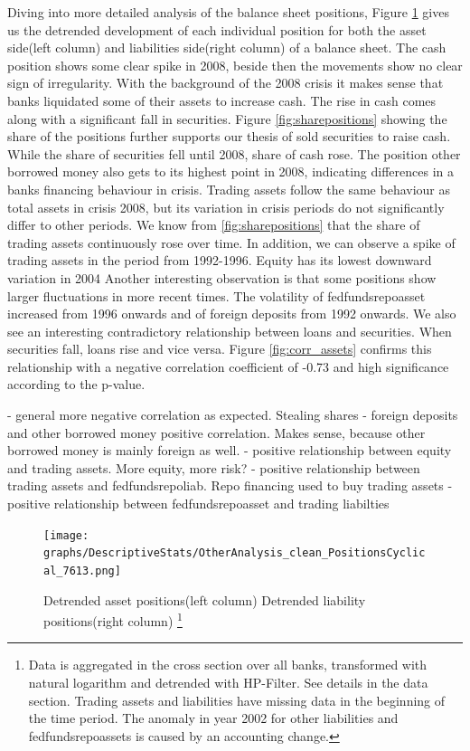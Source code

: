 \documentclass[12pt, a4paper]{article} %
\begin{document}
Diving into more detailed analysis of the balance sheet positions, Figure \ref{fig:positions} gives us the detrended development of each individual position for both the asset side(left column) and liabilities side(right column) of a balance sheet. 
The cash position shows some clear spike in 2008, beside then the movements show no clear sign of irregularity. With the background of the 2008 crisis it makes sense that banks liquidated some of their assets to increase cash. The rise in cash comes along with a significant fall in securities. Figure \ref{fig:sharepositions} showing the share of the positions further supports our thesis of sold securities to raise cash. While the share of securities fell until 2008, share of cash rose.
The position other borrowed money also gets to its highest point in 2008, indicating differences in a banks financing behaviour in crisis. 
Trading assets follow the same behaviour as total assets in crisis 2008, but its variation in crisis periods do not significantly differ to other periods. We know from \ref{fig:sharepositions} that the share of trading assets continuously rose over time. In addition, we can observe a spike of trading assets in the period from 1992-1996.
Equity has its lowest downward variation in 2004
Another interesting observation is that some positions show larger fluctuations in more recent times. The volatility of fedfundsrepoasset increased from 1996 onwards and of foreign deposits from 1992 onwards. 
We also see an interesting contradictory relationship between loans and securities. When securities fall, loans rise and vice versa. Figure \ref{fig:corr_assets} confirms this relationship with a negative correlation coefficient of -0.73 and high significance according to the p-value.



- general more negative correlation as expected. Stealing shares
- foreign deposits and other borrowed money positive correlation. Makes sense, because other borrowed money is mainly foreign as well.
- positive relationship between equity and trading assets. More equity, more risk?
- positive relationship between trading assets and fedfundsrepoliab. Repo financing used to buy trading assets
- positive relationship between fedfundsrepoasset and trading liabilties 


\begin{figure}[hbtp]
\begin{minipage}{\textwidth}

\centering
\caption[1]{Detrended asset positions(left column) \hspace{2cm} Detrended liability positions(right column) \footnote{Data is aggregated in the cross section over all banks, transformed with natural logarithm and detrended with HP-Filter. See details in the data section. Trading assets and liabilities have missing data in the beginning of the time period. The anomaly in year 2002 for other liabilities and fedfundsrepoassets is caused by an accounting change.} }
\texttt{[image: graphs/DescriptiveStats/OtherAnalysis\_clean\_PositionsCyclical\_7613.png]}
\label{fig:positions}

\end{minipage}
\end{figure}
\end{document}
